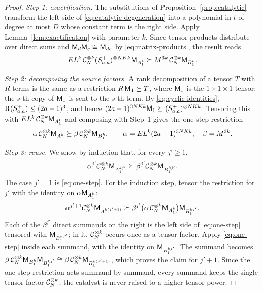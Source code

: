 \begin{proof}
\emph{Step 1: exactification.} The substitutions of
Proposition~\ref{prop:catalytic} transform the left side of
\eqref{eq:catalytic-degeneration} into a polynomial in \(t\) of degree at
most \(D\) whose constant term is the right side. Apply
Lemma~\ref{lem:exactification} with parameter \(k\). Since tensor products
distribute over direct sums and \(\mathsf M_d\mathsf M_e\cong\mathsf M_{de}\) by
\eqref{eq:matrix-products}, the result reads
\[
 EL^k\,\mathcal C_N^{\otimes k}(S^+_{a,a})^{\otimes NKk}\mathsf M_{A_1^k}
 \succeq M^{3k}\,\mathcal C_N^{\otimes k}\mathsf M_{B_1^k}.
\]

\emph{Step 2: decomposing the source factors.} A rank decomposition of a
tensor \(T\) with \(R\) terms is the same as a restriction
\(R\,\mathsf M_1\succeq T\), where \(\mathsf M_1\) is the \(1\times1\times1\) tensor:
the \(s\)-th copy of \(\mathsf M_1\) is sent to the \(s\)-th term. By
\eqref{eq:cyclic-identities}, \(\operatorname{R}(S^+_{a,a})\le(2a-1)^3\), and hence
\((2a-1)^{3NKk}\mathsf M_1\succeq(S^+_{a,a})^{\otimes NKk}\). Tensoring this with
\(EL^k\,\mathcal C_N^{\otimes k}\mathsf M_{A_1^k}\) and composing with Step~1 gives the
one-step restriction
\begin{equation}\label{eq:one-step}
 \alpha\,\mathcal C_N^{\otimes k}\mathsf M_{A_1^k}
 \succeq\beta\,\mathcal C_N^{\otimes k}\mathsf M_{B_1^k},
 \qquad \alpha=EL^k(2a-1)^{3NKk},\quad \beta=M^{3k}.
\end{equation}

\emph{Step 3: reuse.} We show by induction that, for every \(j'\ge1\),
\[
 \alpha^{j'}\mathcal C_N^{\otimes k}\mathsf M_{A_1^{kj'}}
 \succeq\beta^{j'}\mathcal C_N^{\otimes k}\mathsf M_{B_1^{kj'}}.
\]
The case \(j'=1\) is \eqref{eq:one-step}. For the induction step, tensor
the restriction for \(j'\) with the identity on
\(\alpha\mathsf M_{A_1^k}\):
\[
 \alpha^{j'+1}\mathcal C_N^{\otimes k}\mathsf M_{A_1^{k(j'+1)}}
 \succeq\beta^{j'}\bigl(\alpha\,\mathcal C_N^{\otimes k}\mathsf M_{A_1^k}\bigr)
 \mathsf M_{B_1^{kj'}}.
\]
Each of the \(\beta^{j'}\) direct summands on the right is the left side
of \eqref{eq:one-step} tensored with \(\mathsf M_{B_1^{kj'}}\); in it,
\(\mathcal C_N^{\otimes k}\) occurs once as a tensor factor. Apply
\eqref{eq:one-step} inside each summand, with the identity on
\(\mathsf M_{B_1^{kj'}}\). The summand becomes
\(\beta\,\mathcal C_N^{\otimes k}\mathsf M_{B_1^k}\mathsf M_{B_1^{kj'}}\cong
\beta\,\mathcal C_N^{\otimes k}\mathsf M_{B_1^{k(j'+1)}}\), which proves the claim for
\(j'+1\). Since the one-step restriction acts summand by summand, every
summand keeps the single tensor factor \(\mathcal C_N^{\otimes k}\); the catalyst
is never raised to a higher tensor power.


\end{proof}
